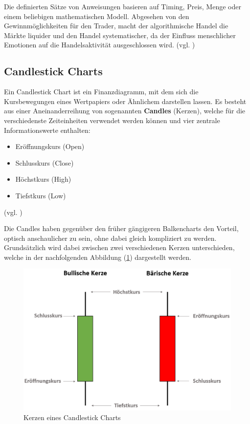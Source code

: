 \documentclass[oneside]{ausarbeitung}
\begin{document}
Die definierten Sätze von Anweisungen basieren auf Timing, Preis, Menge oder einem beliebigen mathematischen Modell. Abgesehen von den Gewinnmöglichkeiten für den Trader, macht der algorithmische Handel die Märkte liquider und den Handel systematischer, da der Einfluss menschlicher Emotionen auf die Handelsaktivität ausgeschlossen wird. (vgl. \cite{algorithmic_trading})

\subsection{Candlestick Charts}
\label{sub:candlestick_charts}

Ein Candlestick Chart ist ein Finanzdiagramm, mit dem sich die Kursbewegungen eines Wertpapiers oder Ähnlichem darstellen lassen. Es besteht aus einer Aneinanderreihung von sogenannten \textbf{Candles} (Kerzen), welche für die verschiedenste Zeiteinheiten verwendet werden können und vier zentrale Informationswerte enthalten:

\begin{itemize}
	\item Eröffnungskurs (Open)
	\item Schlusskurs (Close)
	\item Höchstkurs (High)
	\item Tiefstkurs (Low)
\end{itemize}

(vgl. \cite{candlestick_basics})

Die Candles haben gegenüber den früher gängigeren Balkencharts den Vorteil, optisch anschaulicher zu sein, ohne dabei gleich kompliziert zu werden. Grundsätzlich wird dabei zwischen zwei verschiedenen Kerzen unterschieden, welche in der nachfolgenden Abbildung (\ref{fig:1}) dargestellt werden. \\

\begin{figure}[H]
  \centering
  \includegraphics[height=0.45\textheight]{img/candles.png}
  \caption{Kerzen eines Candlestick Charts}
  \label{fig:1}
\end{figure}
\end{document}
